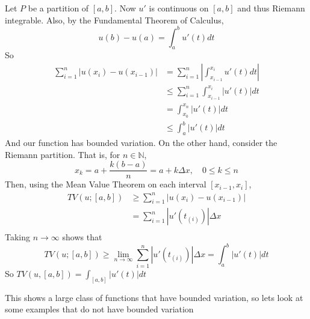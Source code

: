 \documentclass[11pt,a4paper]{article}
\theoremstyle{definition}
\begin{document}
\begin{enumerate}
    Let $P$ be a partition of $[a,b]$. Now $u'$ is continuous on $[a,b]$ and thus Riemann integrable. Also, by the Fundamental Theorem of Calculus, 
    \[
    u(b) - u(a) = \int _a^b u'(t)dt
    \]
    So \begin{align*}
    \sum \limits _{i=1}^n |u(x_i) - u(x_{i-1})| & = \sum \limits _{i=1}^n \left | \int _{x_{i-1}}^{x_i} u'(t)dt\right | \\
    & \le \sum \limits _{i=1}^n \int _{x_{i-1} } ^{x_i}  \left |u'(t)\right |dt \\
    & = \int _{x_0} ^{x_n}\left |  u'(t) \right |d t \\
    & \le \int _a ^b |u'(t)|dt
    \end{align*}
    And our function has bounded variation. On the other hand, consider the Riemann partition. That is, for $n \in \mathbb{N}$, \[x_k = a + \frac{k(b-a)}{n} = a+k \Delta x, \quad 0 \le k \le n\]Then, using the Mean Value Theorem on each interval $[x_{i-1}, x_i]$, \begin{align*}
    TV(u;[a,b]) & \ge \sum \limits _{i=1}^n|u(x_i) - u(x_{i-1})| \\ & = \sum \limits _{i=1}^n|u'(t_{(i)})|\Delta x \\
    \end{align*}
    Taking $n \to \infty$ shows that \[
    TV(u; [a,b]) \ge \lim \limits _{n \to \infty} \sum \limits _{i=1}^n |u'(t_{(i)})| \Delta x = \int _a ^b |u'(t)|dt
    \]
    So $TV(u, [a,b]) = \int _{[a,b]} |u'(t)|dt$

\end{enumerate}
\noindent
This shows a large class of functions that have bounded variation, so lets look at some examples that do not have bounded variation
\end{document}
